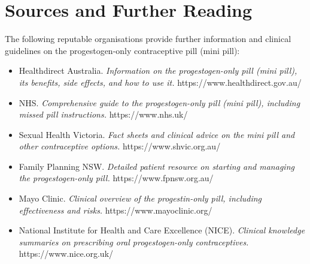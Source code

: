 \section*{Sources and Further Reading}
The following reputable organisations provide further information and clinical guidelines on the progestogen-only contraceptive pill (mini pill):
\begin{itemize}
    \item Healthdirect Australia. \textit{Information on the progestogen-only pill (mini pill), its benefits, side effects, and how to use it.} https://www.healthdirect.gov.au/
    \item NHS. \textit{Comprehensive guide to the progestogen-only pill (mini pill), including missed pill instructions.} https://www.nhs.uk/
    \item Sexual Health Victoria. \textit{Fact sheets and clinical advice on the mini pill and other contraceptive options.} https://www.shvic.org.au/
    \item Family Planning NSW. \textit{Detailed patient resource on starting and managing the progestogen-only pill.} https://www.fpnsw.org.au/
    \item Mayo Clinic. \textit{Clinical overview of the progestin-only pill, including effectiveness and risks.} https://www.mayoclinic.org/
    \item National Institute for Health and Care Excellence (NICE). \textit{Clinical knowledge summaries on prescribing oral progestogen-only contraceptives.} https://www.nice.org.uk/
\end{itemize}
